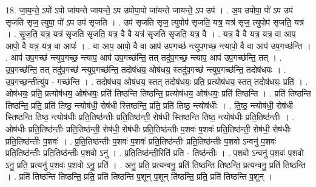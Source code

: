 \documentclass[17pt]{extarticle}
\begin{document}
18. जा॒य॒न्ते॒ ऽपो॑ ऽपो जा॑यन्ते जायन्ते॒ ऽप उपोपा॒पो जा॑यन्ते जायन्ते॒ ऽप उप॑ । . अ॒प उपोपा॒ पो॑ ऽप उप॑ सृजति सृज॒ त्युपा॒ पो॑ ऽप उप॑ सृजति । . उप॑ सृजति सृज॒ त्युपोप॑ सृजति॒ यत्र॒ यत्र॑ सृज॒ त्युपोप॑ सृजति॒ यत्र॑ । . सृ॒ज॒ति॒ यत्र॒ यत्र॑ सृजति सृजति॒ यत्र॒ वै वै यत्र॑ सृजति सृजति॒ यत्र॒ वै । . यत्र॒ वै वै यत्र॒ यत्र॒ वा आप॒ आपो॒ वै यत्र॒ यत्र॒ वा आपः॑ । . वा आप॒ आपो॒ वै वा आप॑ उप॒गच्छ॑ न्त्युप॒गच्छ॒ न्त्यापो॒ वै वा आप॑ उप॒गच्छ॑न्ति । . आप॑ उप॒गच्छ॑ न्त्युप॒गच्छ॒ न्त्याप॒ आप॑ उप॒गच्छ॑न्ति॒ तत् तदु॑प॒गच्छ॒ न्त्याप॒ आप॑ उप॒गच्छ॑न्ति॒ तत् । . उ॒प॒गच्छ॑न्ति॒ तत् तदु॑प॒गच्छ॑ न्त्युप॒गच्छ॑न्ति॒ तदोष॑धय॒ ओष॑धय॒ स्तदु॑प॒गच्छ॑ न्त्युप॒गच्छ॑न्ति॒ तदोष॑धयः । . उ॒प॒गच्छ॒न्तीत्यु॑प - गच्छ॑न्ति । . तदोष॑धय॒ ओष॑धय॒ स्तत् तदोष॑धयः॒ प्रति॒ प्रत्योष॑धय॒ स्तत् तदोष॑धयः॒ प्रति॑ । . ओष॑धयः॒ प्रति॒ प्रत्योष॑धय॒ ओष॑धयः॒ प्रति॑ तिष्ठन्ति तिष्ठन्ति॒ प्रत्योष॑धय॒ ओष॑धयः॒ प्रति॑ तिष्ठन्ति । . प्रति॑ तिष्ठन्ति तिष्ठन्ति॒ प्रति॒ प्रति॑ तिष्ठ॒ न्त्योष॑धी॒ रोष॑धी स्तिष्ठन्ति॒ प्रति॒ प्रति॑ तिष्ठ॒ न्त्योष॑धीः । . ति॒ष्ठ॒ न्त्योष॑धी॒ रोष॑धी स्तिष्ठन्ति तिष्ठ॒ न्त्योष॑धीः प्रति॒तिष्ठ॑न्तीः प्रति॒तिष्ठ॑न्ती॒ रोष॑धी स्तिष्ठन्ति तिष्ठ॒ न्त्योष॑धीः प्रति॒तिष्ठ॑न्तीः । . ओष॑धीः प्रति॒तिष्ठ॑न्तीः प्रति॒तिष्ठ॑न्ती॒ रोष॑धी॒ रोष॑धीः प्रति॒तिष्ठ॑न्तीः प॒शवः॑ प॒शवः॑ प्रति॒तिष्ठ॑न्ती॒ रोष॑धी॒ रोष॑धीः प्रति॒तिष्ठ॑न्तीः प॒शवः॑ । . प्र॒ति॒तिष्ठ॑न्तीः प॒शवः॑ प॒शवः॑ प्रति॒तिष्ठ॑न्तीः प्रति॒तिष्ठ॑न्तीः प॒शवो ऽन्वनु॑ प॒शवः॑ प्रति॒तिष्ठ॑न्तीः प्रति॒तिष्ठ॑न्तीः प॒शवो ऽनु॑ । . प्र॒ति॒तिष्ठ॑न्ती॒रिति॑ प्रति - तिष्ठ॑न्तीः । . प॒शवो ऽन्वनु॑ प॒शवः॑ प॒शवो ऽनु॒ प्रति॒ प्रत्यनु॑ प॒शवः॑ प॒शवो ऽनु॒ प्रति॑ । . अनु॒ प्रति॒ प्रत्यन्वनु॒ प्रति॑ तिष्ठन्ति तिष्ठन्ति॒ प्रत्यन्वनु॒ प्रति॑ तिष्ठन्ति । . प्रति॑ तिष्ठन्ति तिष्ठन्ति॒ प्रति॒ प्रति॑ तिष्ठन्ति प॒शून् प॒शून् ति॑ष्ठन्ति॒ प्रति॒ प्रति॑ तिष्ठन्ति प॒शून् । \newline
\end{document}
